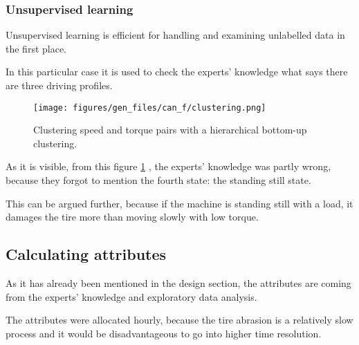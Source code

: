 	\subsubsection{Unsupervised learning}
	Unsupervised learning is efficient for handling and examining unlabelled data in the first place.
	
	In this particular case it is used to check the experts' knowledge what says there are three driving profiles.
	\begin{figure}[H]
			\centering
			\texttt{[image: figures/gen\_files/can\_f/clustering.png]}
			\caption{Clustering speed and torque pairs with a hierarchical bottom-up clustering.\label{fig:clustering}} 
	\end{figure}
	As it is visible, from this figure \ref{fig:clustering} , the experts' knowledge was partly wrong, because they forgot to mention the fourth state: the standing still state.

	This can be argued further, because if the machine is standing still with a load, it damages the tire more than moving slowly with low torque.
\newpage
\subsection{Calculating attributes}
As it has already been mentioned in the design section, the attributes are coming from the experts' knowledge and exploratory data analysis.

The attributes were allocated hourly, because the tire abrasion is a relatively slow process and it would be disadvantageous to go into higher time resolution.

